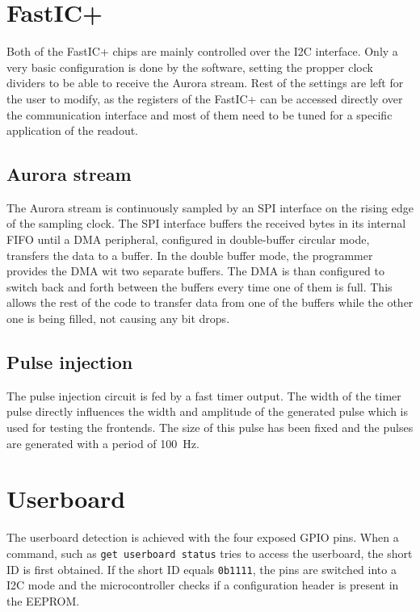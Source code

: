 \section{FastIC+}
Both of the FastIC+ chips are mainly controlled over the I2C interface. Only a very basic configuration is done by the software, setting the propper clock dividers to be able to receive the Aurora stream. Rest of the settings are left for the user to modify, as the registers of the FastIC+ can be accessed directly over the communication interface and most of them need to be tuned for a specific application of the readout.

\subsection{Aurora stream}
The Aurora stream is continuously sampled by an SPI interface on the rising edge of the sampling clock. The SPI interface buffers the received bytes in its internal FIFO until a DMA peripheral, configured in double-buffer circular mode, transfers the data to a buffer. In the double buffer mode, the programmer provides the DMA wit two separate buffers. The DMA is than configured to switch back and forth between the buffers every time one of them is full. This allows the rest of the code to transfer data from one of the buffers while the other one is being filled, not causing any bit drops. 

\subsection{Pulse injection}

The pulse injection circuit is fed by a fast timer output. The width of the timer pulse directly influences the width and amplitude of the generated pulse which is used for testing the frontends. The size of this pulse has been fixed and the pulses are generated with a period of \SI{100}{\hertz}. 
\newpage
\section{Userboard}

The userboard detection is achieved with the four exposed GPIO pins. When a command, such as \verb|get userboard status| tries to access the userboard, the short ID is first obtained. If the short ID equals \verb|0b1111|, the pins are switched into a I2C mode and the microcontroller checks if a configuration header is present in the EEPROM. 

